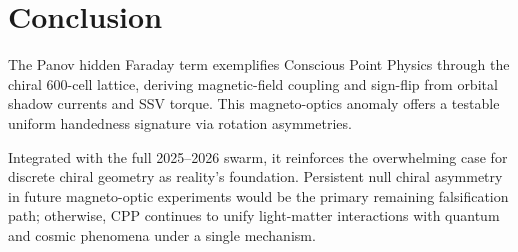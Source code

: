 \documentclass[11pt]{article}
\begin{document}
\section{Conclusion}
The Panov hidden Faraday term exemplifies Conscious Point Physics through the chiral 600-cell lattice, deriving magnetic-field coupling and sign-flip from orbital shadow currents and SSV torque. This magneto-optics anomaly offers a testable uniform handedness signature via rotation asymmetries.  

Integrated with the full 2025--2026 swarm, it reinforces the overwhelming case for discrete chiral geometry as reality's foundation. Persistent null chiral asymmetry in future magneto-optic experiments would be the primary remaining falsification path; otherwise, CPP continues to unify light-matter interactions with quantum and cosmic phenomena under a single mechanism.
\end{document}

